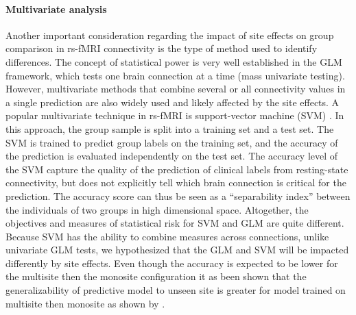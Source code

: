 \documentclass[authoryear]{elsarticle}
\begin{document}
\paragraph{Multivariate analysis}
Another important consideration regarding the impact of site effects on group comparison in rs-fMRI connectivity is the type of method used to identify differences. The concept of statistical power is very well established in the GLM framework, which tests one brain connection at a time (mass univariate testing). However, multivariate methods that combine several or all connectivity values in a single prediction are also widely used and likely affected by the site effects. A popular multivariate technique in rs-fMRI is support-vector machine (SVM) \citep{Cortes1995}. In this approach, the group sample is split into a training set and a test set. The SVM is trained to predict group labels on the training set, and the accuracy of the prediction is evaluated independently on the test set.  The accuracy level of the SVM capture the quality of the prediction of clinical labels from resting-state connectivity, but does not explicitly tell which brain connection is critical for the prediction. The accuracy score can thus be seen as a “separability index” between the individuals of two groups in high dimensional space. Altogether, the objectives and measures of statistical risk for SVM and GLM are quite different. Because SVM has the ability to combine measures across connections, unlike univariate GLM tests, we hypothesized that the GLM and SVM will be impacted differently by site effects. Even though the accuracy is expected to be lower for the multisite then the monosite configuration it as been shown that the generalizability of predictive model to unseen site is greater for model trained on multisite then monosite as shown by \cite{Abraham2016}.
\end{document}
